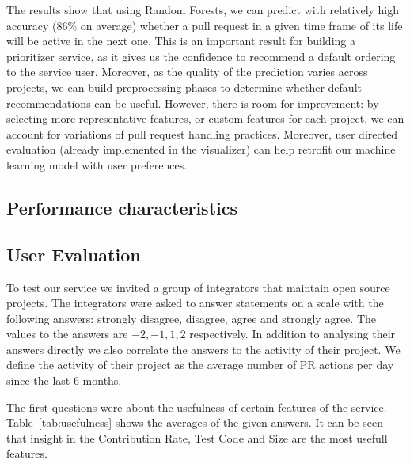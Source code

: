 \documentclass[conference]{IEEEtran}
\begin{document}
The results show that using Random Forests, we can predict with relatively
high accuracy (86\% on average) whether a pull request in a given time frame
of its life will be active in the next one. This is an important result
for building a prioritizer service, as it gives us the confidence to
recommend a default ordering to the service user. Moreover, as the
quality of the prediction varies across projects, we can build preprocessing
phases to determine whether default recommendations can be useful.
However, there is room for improvement: by selecting more representative
features, or custom features for each project, we can account for variations
of pull request handling practices. Moreover, user directed evaluation (already
implemented in the visualizer) can help retrofit our machine learning model
with user preferences.

\subsection{Performance characteristics}

\subsection{User Evaluation}

To test our service we invited a group of integrators that maintain open source projects.
The integrators were asked to answer statements on a scale with the following answers: strongly disagree, disagree, agree and strongly agree.
The values to the answers are ${-2, -1, 1, 2}$ respectively.
In addition to analysing their answers directly we also correlate the answers to the activity of their project.
We define the activity of their project as the average number of PR actions per day since the last 6 months.

The first questions were about the usefulness of certain features of the service.
Table~\ref{tab:usefulness} shows the averages of the given answers.
It can be seen that insight in the Contribution Rate, Test Code and Size are the most usefull features.

\end{document}
